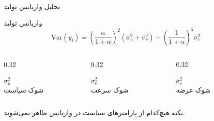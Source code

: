 \documentclass[aspectratio=169,11pt]{beamer}
\begin{document}
\begin{frame}{تحلیل واریانس تولید}
	\begin{block}{واریانس تولید}
		\[
			\text{Var}(y_t) = \left(\frac{\alpha}{1+\alpha}\right)^2 (\sigma_u^2 + \sigma_v^2) + \left(\frac{1}{1+\alpha}\right)^2 \sigma_\varepsilon^2
		\]
	\end{block}
	\vspace{0.3cm}
	\begin{LTR}
		\begin{columns}[T]
			\begin{column}{0.32\textwidth}
				\begin{RTL}
					\centering
					$\sigma_u^2$\\[0.2cm]
					\small شوک سیاست
				\end{RTL}
			\end{column}
			\hfill
			\begin{column}{0.32\textwidth}
				\begin{RTL}
					\centering
					$\sigma_v^2$\\[0.2cm]
					\small شوک سرعت
				\end{RTL}
			\end{column}
			\hfill
			\begin{column}{0.32\textwidth}
				\begin{RTL}
					\centering
					$\sigma_\varepsilon^2$\\[0.2cm]
					\small شوک عرضه
				\end{RTL}
			\end{column}
		\end{columns}
	\end{LTR}
	\vspace{0.3cm}
	\begin{alertblock}{نکته}
		هیچ‌کدام از پارامترهای سیاست در واریانس ظاهر نمی‌شوند.
	\end{alertblock}
\end{frame}
\end{document}
